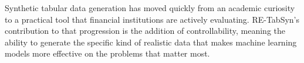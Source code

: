 Synthetic tabular data generation has moved quickly from an academic curiosity to a practical tool that financial institutions are actively evaluating. RE-TabSyn's contribution to that progression is the addition of controllability, meaning the ability to generate the specific kind of realistic data that makes machine learning models more effective on the problems that matter most.
